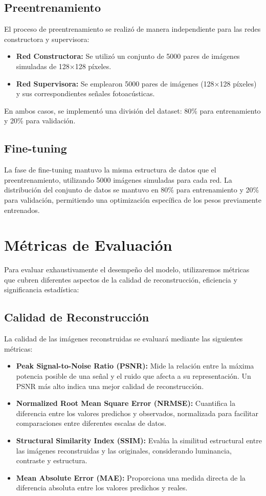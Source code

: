 \subsection{Preentrenamiento}
El proceso de preentrenamiento se realizó de manera independiente para las redes constructora y supervisora:
\begin{itemize}
\item \textbf{Red Constructora:} Se utilizó un conjunto de 5000 pares de imágenes simuladas de 128×128 píxeles.
\item \textbf{Red Supervisora:} Se emplearon 5000 pares de imágenes (128×128 píxeles) y sus correspondientes señales fotoacústicas.
\end{itemize}
En ambos casos, se implementó una división del dataset: 80\% para entrenamiento y 20\% para validación.
\subsection{Fine-tuning}
La fase de fine-tuning mantuvo la misma estructura de datos que el preentrenamiento, utilizando 5000 imágenes simuladas para cada red. La distribución del conjunto de datos se mantuvo en 80\% para entrenamiento y 20\% para validación, permitiendo una optimización específica de los pesos previamente entrenados.

\section{Métricas de Evaluación} \label{sec:metrics}

Para evaluar exhaustivamente el desempeño del modelo, utilizaremos métricas que cubren diferentes aspectos de la calidad de reconstrucción, eficiencia y significancia estadística:

\subsection{Calidad de Reconstrucción}
La calidad de las imágenes reconstruidas se evaluará mediante las siguientes métricas:

\begin{itemize}
    \item \textbf{Peak Signal-to-Noise Ratio (PSNR):} Mide la relación entre la máxima potencia posible de una señal y el ruido que afecta a su representación. Un PSNR más alto indica una mejor calidad de reconstrucción.
    
    \item \textbf{Normalized Root Mean Square Error (NRMSE):} Cuantifica la diferencia entre los valores predichos y observados, normalizada para facilitar comparaciones entre diferentes escalas de datos.
    
    \item \textbf{Structural Similarity Index (SSIM):} Evalúa la similitud estructural entre las imágenes reconstruidas y las originales, considerando luminancia, contraste y estructura.
    
    \item \textbf{Mean Absolute Error (MAE):} Proporciona una medida directa de la diferencia absoluta entre los valores predichos y reales.
\end{itemize}

